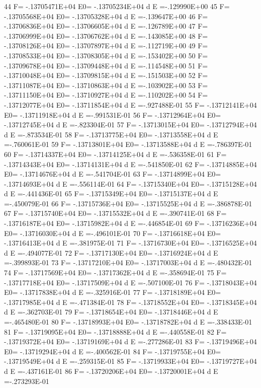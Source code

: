   44 F= -.13705471E+04 E0= -.13705234E+04  d E =-.129990E+00
  45 F= -.13705568E+04 E0= -.13705328E+04  d E =-.139647E+00
  46 F= -.13706836E+04 E0= -.13706605E+04  d E =-.126789E+00
  47 F= -.13706999E+04 E0= -.13706762E+04  d E =-.143085E+00
  48 F= -.13708126E+04 E0= -.13707897E+04  d E =-.112719E+00
  49 F= -.13708533E+04 E0= -.13708305E+04  d E =-.153402E+00
  50 F= -.13709678E+04 E0= -.13709448E+04  d E =-.114548E+00
  51 F= -.13710048E+04 E0= -.13709815E+04  d E =-.151503E+00
  52 F= -.13711087E+04 E0= -.13710863E+04  d E =-.103902E+00
  53 F= -.13711150E+04 E0= -.13710927E+04  d E =-.110202E+00
  54 F= -.13712077E+04 E0= -.13711854E+04  d E =-.927488E-01
  55 F= -.13712141E+04 E0= -.13711918E+04  d E =-.991531E-01
  56 F= -.13712964E+04 E0= -.13712745E+04  d E =-.823304E-01
  57 F= -.13713015E+04 E0= -.13712794E+04  d E =-.873534E-01
  58 F= -.13713775E+04 E0= -.13713558E+04  d E =-.760061E-01
  59 F= -.13713801E+04 E0= -.13713588E+04  d E =-.786397E-01
  60 F= -.13714337E+04 E0= -.13714125E+04  d E =-.536358E-01
  61 F= -.13714343E+04 E0= -.13714131E+04  d E =-.541850E-01
  62 F= -.13714885E+04 E0= -.13714676E+04  d E =-.541704E-01
  63 F= -.13714899E+04 E0= -.13714693E+04  d E =-.556114E-01
  64 F= -.13715340E+04 E0= -.13715128E+04  d E =-.441436E-01
  65 F= -.13715349E+04 E0= -.13715137E+04  d E =-.450079E-01
  66 F= -.13715736E+04 E0= -.13715525E+04  d E =-.386878E-01
  67 F= -.13715740E+04 E0= -.13715532E+04  d E =-.390741E-01
  68 F= -.13716187E+04 E0= -.13715982E+04  d E =-.446854E-01
  69 F= -.13716236E+04 E0= -.13716030E+04  d E =-.496101E-01
  70 F= -.13716618E+04 E0= -.13716413E+04  d E =-.381975E-01
  71 F= -.13716730E+04 E0= -.13716525E+04  d E =-.494077E-01
  72 F= -.13717130E+04 E0= -.13716924E+04  d E =-.399893E-01
  73 F= -.13717210E+04 E0= -.13717003E+04  d E =-.480432E-01
  74 F= -.13717569E+04 E0= -.13717362E+04  d E =-.358694E-01
  75 F= -.13717718E+04 E0= -.13717509E+04  d E =-.507100E-01
  76 F= -.13718043E+04 E0= -.13717838E+04  d E =-.325916E-01
  77 F= -.13718189E+04 E0= -.13717985E+04  d E =-.471384E-01
  78 F= -.13718552E+04 E0= -.13718345E+04  d E =-.362703E-01
  79 F= -.13718654E+04 E0= -.13718446E+04  d E =-.465480E-01
  80 F= -.13718993E+04 E0= -.13718782E+04  d E =-.338433E-01
  81 F= -.13719095E+04 E0= -.13718888E+04  d E =-.440558E-01
  82 F= -.13719372E+04 E0= -.13719169E+04  d E =-.277286E-01
  83 F= -.13719496E+04 E0= -.13719294E+04  d E =-.400562E-01
  84 F= -.13719755E+04 E0= -.13719549E+04  d E =-.259315E-01
  85 F= -.13719933E+04 E0= -.13719727E+04  d E =-.437161E-01
  86 F= -.13720206E+04 E0= -.13720001E+04  d E =-.273293E-01
